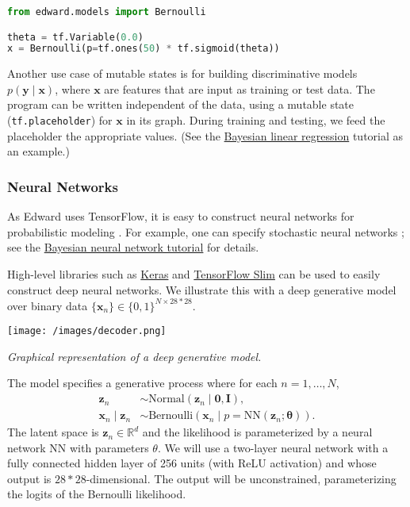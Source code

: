 \begin{lstlisting}[language=python]
from edward.models import Bernoulli

theta = tf.Variable(0.0)
x = Bernoulli(p=tf.ones(50) * tf.sigmoid(theta))
\end{lstlisting}

Another use case of mutable states is for building discriminative
models $p(\mathbf{y}\mid\mathbf{x})$, where $\mathbf{x}$ are features
that are input as training or test data. The program can be written
independent of the data, using a mutable state
(\texttt{tf.placeholder}) for $\mathbf{x}$ in its graph. During
training and testing, we feed the placeholder the appropriate values.
(See the
\href{/tutorials/bayesian-linear-regression}{Bayesian linear
regression} tutorial as an example.)

\subsubsection{Neural Networks}

As Edward uses TensorFlow, it is easy to construct neural networks for
probabilistic modeling \citep{rumelhart1988parallel}.
For example, one can specify stochastic neural networks
\citep{neal1990learning}; see the
\href{/tutorials/bayesian-neural-network}{Bayesian neural network tutorial}
for details.

High-level libraries such as
\href{http://keras.io}{Keras} and
\href{https://github.com/tensorflow/tensorflow/tree/master/tensorflow/contrib/slim}{TensorFlow Slim}
can be used to easily construct deep neural networks.
We illustrate this with a deep generative model over binary data
$\{\mathbf{x}_n\}\in\{0,1\}^{N\times 28*28}$.

\texttt{[image: /images/decoder.png]}

{\small\textit{Graphical representation of a deep generative model.}}

The model specifies a generative process where for each
$n=1,\ldots,N$,
%
\begin{align*}
\mathbf{z}_n &\sim \text{Normal}(\mathbf{z}_n \mid \mathbf{0}, \mathbf{I}), \\[1.5ex]
\mathbf{x}_n\mid \mathbf{z}_n &\sim \text{Bernoulli}(\mathbf{x}_n\mid
p=\mathrm{NN}(\mathbf{z}_n; \mathbf{\theta})).
\end{align*}
%
The latent space is $\mathbf{z}_n\in\mathbb{R}^d$ and the
likelihood is parameterized by a neural network $\mathrm{NN}$ with
parameters $\theta$. We will use a two-layer neural network with a
fully connected hidden layer of 256 units (with ReLU activation) and
whose output is $28*28$-dimensional. The output will be unconstrained,
parameterizing the logits of the Bernoulli likelihood.

